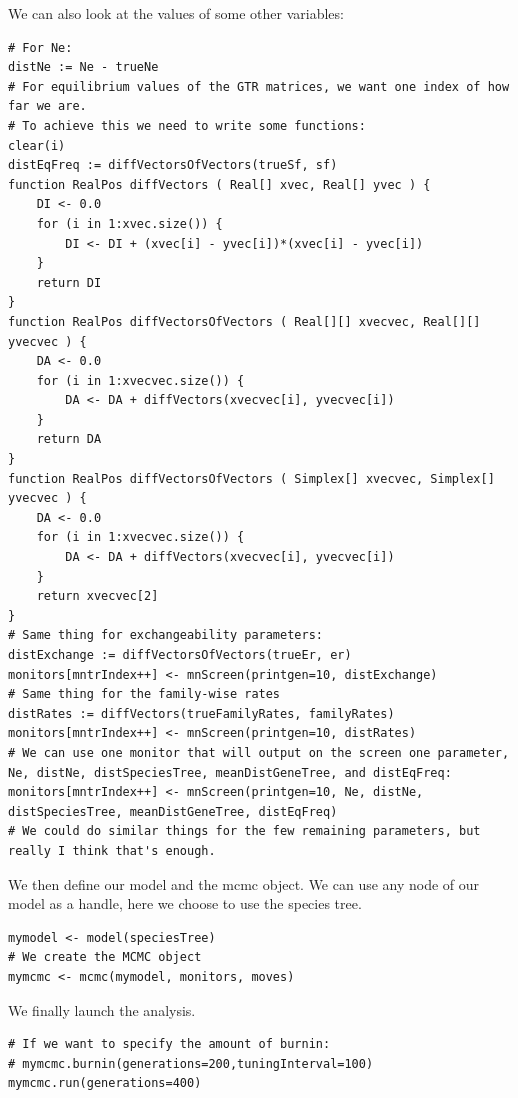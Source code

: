 \documentclass[11pt]{article}
\begin{document}
{\begin{framed}
We can also look at the values of some other variables:
{\tt \begin{snugshade*}
\begin{lstlisting}
# For Ne:
distNe := Ne - trueNe
# For equilibrium values of the GTR matrices, we want one index of how far we are.
# To achieve this we need to write some functions:
clear(i)
distEqFreq := diffVectorsOfVectors(trueSf, sf)	
function RealPos diffVectors ( Real[] xvec, Real[] yvec ) { 
	DI <- 0.0
	for (i in 1:xvec.size()) {
		DI <- DI + (xvec[i] - yvec[i])*(xvec[i] - yvec[i])
	}
	return DI
}
function RealPos diffVectorsOfVectors ( Real[][] xvecvec, Real[][] yvecvec ) { 
	DA <- 0.0
	for (i in 1:xvecvec.size()) {
		DA <- DA + diffVectors(xvecvec[i], yvecvec[i])
	}
	return DA
}		
function RealPos diffVectorsOfVectors ( Simplex[] xvecvec, Simplex[] yvecvec ) { 
	DA <- 0.0
	for (i in 1:xvecvec.size()) {
		DA <- DA + diffVectors(xvecvec[i], yvecvec[i])
	}
	return xvecvec[2]
}
# Same thing for exchangeability parameters:
distExchange := diffVectorsOfVectors(trueEr, er)
monitors[mntrIndex++] <- mnScreen(printgen=10, distExchange)
# Same thing for the family-wise rates
distRates := diffVectors(trueFamilyRates, familyRates)
monitors[mntrIndex++] <- mnScreen(printgen=10, distRates)
# We can use one monitor that will output on the screen one parameter, Ne, distNe, distSpeciesTree, meanDistGeneTree, and distEqFreq:
monitors[mntrIndex++] <- mnScreen(printgen=10, Ne, distNe, distSpeciesTree, meanDistGeneTree, distEqFreq)
# We could do similar things for the few remaining parameters, but really I think that's enough.
\end{lstlisting}
\end{snugshade*}}

We then define our model and the mcmc object. We can use any node of our model as a handle, here we choose to use the species tree.
{\tt \begin{snugshade*}
\begin{lstlisting}
mymodel <- model(speciesTree)
# We create the MCMC object
mymcmc <- mcmc(mymodel, monitors, moves)
\end{lstlisting}
\end{snugshade*}}

We finally launch the analysis.
{\tt \begin{snugshade*}
\begin{lstlisting}
# If we want to specify the amount of burnin:
# mymcmc.burnin(generations=200,tuningInterval=100)
mymcmc.run(generations=400)

\end{lstlisting}
\end{snugshade*}}



\end{framed}}
\end{document}
